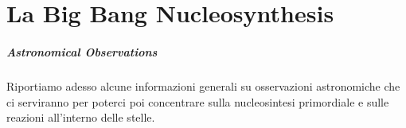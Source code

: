 \newcommand{\sol}{_{\odot}}
\newcommand{\Msol}{$M\sol { }$}


\chapter{La Big Bang Nucleosynthesis}\label{cap-BBN}

\paragraph{Astronomical Observations}
Riportiamo adesso alcune informazioni generali su osservazioni astronomiche che ci serviranno per poterci poi concentrare sulla nucleosintesi primordiale e sulle reazioni all'interno delle stelle.



